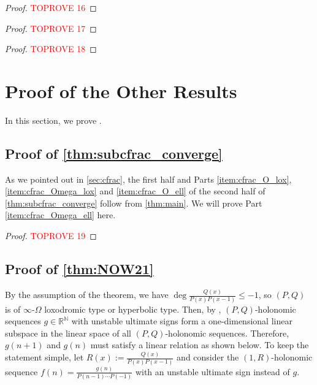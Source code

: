 \documentclass[a4paper,UKenglish,cleveref,autoref,thm-restate]{lipics-v2021}
\newcommand{\R}{\mathbb{R}}
\newcommand{\N}{\mathbb{N}}
\begin{document}
\begin{proof}\textcolor{red}{TOPROVE 16}\end{proof}

\begin{proof}\textcolor{red}{TOPROVE 17}\end{proof}




\begin{proof}\textcolor{red}{TOPROVE 18}\end{proof}






\section{Proof of the Other Results} \label{sec:proofs_of_related_results}

In this section, we prove . 


\subsection{Proof of \cref{thm:subcfrac_converge}} \label{sec:proof_of_cfrac}

As we pointed out in \cref{sec:cfrac}, the first half and Parts \eqref{item:cfrac_O_lox}, \eqref{item:cfrac_Omega_lox} and \eqref{item:cfrac_O_ell} of the second half of \cref{thm:subcfrac_converge} follow from \cref{thm:main}. We will prove Part \eqref{item:cfrac_Omega_ell} here. 

\begin{proof}\textcolor{red}{TOPROVE 19}\end{proof}







\subsection{Proof of \cref{thm:NOW21}}\label{sec:recovery_of_NOW21}

By the assumption of the theorem, we have $\deg \frac{Q(x)}{P(x)P(x-1)} \leq -1$, so $(P, Q)$ is of $\infty$-$\Omega$ loxodromic type or hyperbolic type. 
Then, by , $(P, Q)$-holonomic sequences $g \in \R^{\N}$ with unstable ultimate signs form a one-dimensional linear subspace in the linear space of all $(P, Q)$-holonomic sequences. 
Therefore, $g(n+1)$ and $g(n)$ must satisfy a linear relation as shown below. To keep the statement simple, let $R(x) := \frac{Q(x)}{P(x)P(x-1)}$ and consider the $(1, R)$-holonomic sequence $f(n) = \frac{g(n)}{P(n-1) \dotsm P(-1)}$ with an unstable ultimate sign instead of $g$. 
\end{document}
